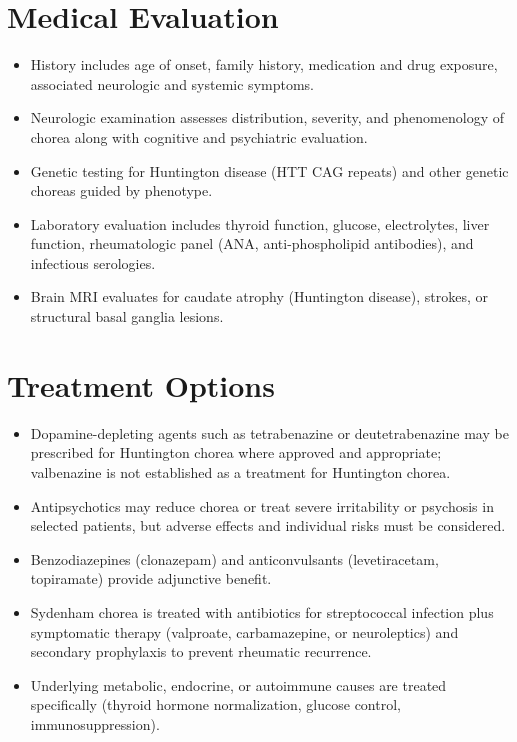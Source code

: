 \section*{Medical Evaluation}
\begin{itemize}
  \item History includes age of onset, family history, medication and drug exposure, associated neurologic and systemic symptoms.
  \item Neurologic examination assesses distribution, severity, and phenomenology of chorea along with cognitive and psychiatric evaluation.
  \item Genetic testing for Huntington disease (HTT CAG repeats) and other genetic choreas guided by phenotype.
  \item Laboratory evaluation includes thyroid function, glucose, electrolytes, liver function, rheumatologic panel (ANA, anti-phospholipid antibodies), and infectious serologies.
  \item Brain MRI evaluates for caudate atrophy (Huntington disease), strokes, or structural basal ganglia lesions.
\end{itemize}

\section*{Treatment Options}
\begin{itemize}
   \item Dopamine-depleting agents such as tetrabenazine or deutetrabenazine may be prescribed for Huntington chorea where approved and appropriate; valbenazine is not established as a treatment for Huntington chorea.
   \item Antipsychotics may reduce chorea or treat severe irritability or psychosis in selected patients, but adverse effects and individual risks must be considered.
  \item Benzodiazepines (clonazepam) and anticonvulsants (levetiracetam, topiramate) provide adjunctive benefit.
  \item Sydenham chorea is treated with antibiotics for streptococcal infection plus symptomatic therapy (valproate, carbamazepine, or neuroleptics) and secondary prophylaxis to prevent rheumatic recurrence.
  \item Underlying metabolic, endocrine, or autoimmune causes are treated specifically (thyroid hormone normalization, glucose control, immunosuppression).
\end{itemize}

